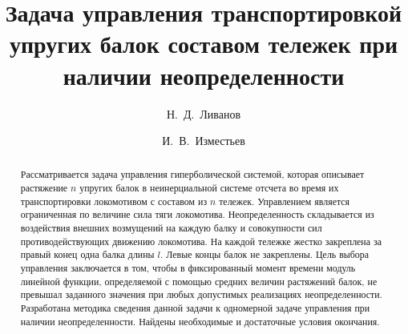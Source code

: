 
\usepackage{iftex}

\ifPDFTeX
\usepackage[T2A]{fontenc}
\usepackage[utf8]{inputenc} %
\usepackage[english,russian]{babel}
\fi

\usepackage{todonotes} 

\usepackage[russian]{nla}


\fi

\title{Задача управления транспортировкой упругих балок составом тележек при наличии неопределенности }
\author{Н.~Д.~Ливанов \and И.~В.~Изместьев
  \and
}


\maketitle

\begin{abstract}
Рассматривается задача управления гиперболической системой, которая описывает растяжение $n$ упругих балок  в неинерциальной системе отсчета во время их транспортировки локомотивом с составом из $n$ тележек. Управлением является ограниченная по величине сила тяги локомотива. Неопределенность складывается из воздействия внешних возмущений на каждую балку и совокупности сил противодействующих движению локомотива. На каждой тележке жестко закреплена за правый конец одна балка длины $l$. Левые концы балок не закреплены. Цель выбора управления заключается в том, чтобы в фиксированный момент времени модуль линейной функции, определяемой с помощью средних величин растяжений балок, не превышал заданного значения при любых допустимых реализациях неопределенности. Разработана методика сведения данной задачи к одномерной задаче управления при наличии неопределенности. Найдены необходимые и достаточные условия окончания.


\end{abstract}

